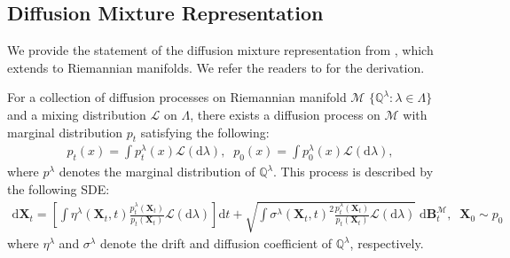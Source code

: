 \subsection{Diffusion Mixture Representation} \label{app:derivation:mixture}
We provide the statement of the diffusion mixture representation from \citet{jo2024riemannian}, which extends \citet{peluchetti2021mixture} to Riemannian manifolds. We refer the readers to \citet{jo2024riemannian} for the derivation.

\begin{tcolorbox}[colback=white,colframe=blue!30!white]
\begin{proposition} \label{prop:mixture}
    For a collection of diffusion processes on Riemannian manifold $\mathcal{M}$ $\{\mathbb{Q}^{\lambda}:\lambda\in\Lambda\}$ and a mixing distribution $\mathcal{L}$ on $\Lambda$, there exists a diffusion process on $\mathcal{M}$ with marginal distribution $p_t$ satisfying the following:
    \begin{align}
        p_t(x) = \int p^{\lambda}_t(x) \mathcal{L}(\mathrm{d}\lambda), \;\; 
        p_0(x) = \int p^{\lambda}_0(x) \mathcal{L}(\mathrm{d}\lambda),
    \end{align}
    where $p^{\lambda}$ denotes the marginal distribution of $\mathbb{Q}^{\lambda}$.
    This process is described by the following SDE:
    \begin{align}
        \mathrm{d}\bm{X}_t = \left[ 
            \int \eta^{\lambda}(\bm{X}_t,t)\frac{p^{\lambda}_t(\bm{X}_t)}{p_t(\bm{X}_t)} \mathcal{L}(\mathrm{d}\lambda) 
        \right]\mathrm{d}t 
        + \sqrt{\int \sigma^{\lambda}(\bm{X}_t,t)^2 \frac{p^{\lambda}_t(\bm{X}_t)}{p_t(\bm{X}_t)} \mathcal{L}(\mathrm{d}\lambda)} \; \mathrm{d}\mathbf{B}^{\mathcal{M}}_t, \;\;
        \bm{X}_0\sim p_0
    \end{align}
    where $\eta^{\lambda}$ and $\sigma^{\lambda}$ denote the drift and diffusion coefficient of $\mathbb{Q}^{\lambda}$, respectively.
\end{proposition}
\end{tcolorbox}




